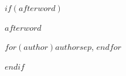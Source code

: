 $if(afterword)$
\label{afterword}

\begingroup
\setlength{\parindent}{1.5em}
\noindent
$afterword$

\vspace{24pt}
\begin{flushright}
\afterwordflourish
{\scshape{}\MakeTextLowercase{$for(author)$$author$$sep$, $endfor$}}
\end{flushright}
\endgroup
$endif$
